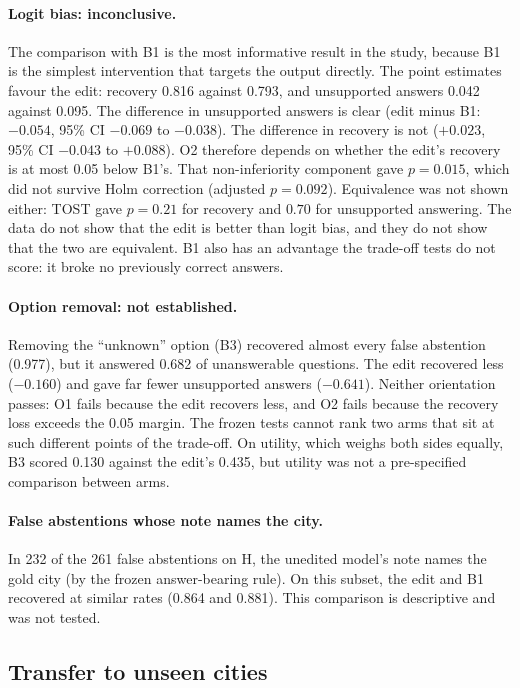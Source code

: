 \paragraph{Logit bias: inconclusive.}
The comparison with B1 is the most informative result in the study, because B1 is the simplest intervention that
targets the output directly. The point estimates favour the edit: recovery 0.816 against 0.793, and unsupported
answers 0.042 against 0.095. The difference in unsupported answers is clear (edit minus B1: $-0.054$, 95\% CI
$-0.069$ to $-0.038$). The difference in recovery is not ($+0.023$, 95\% CI $-0.043$ to $+0.088$). O2 therefore
depends on whether the edit's recovery is at most 0.05 below B1's. That non-inferiority component gave $p = 0.015$,
which did not survive Holm correction (adjusted $p = 0.092$). Equivalence was not shown either: TOST gave $p = 0.21$
for recovery and $0.70$ for unsupported answering. The data do not show that the edit is better than logit bias, and
they do not show that the two are equivalent. B1 also has an advantage the trade-off tests do not score: it broke no
previously correct answers.

\paragraph{Option removal: not established.}
Removing the ``unknown'' option (B3) recovered almost every false abstention (0.977), but it answered 0.682 of
unanswerable questions. The edit recovered less ($-0.160$) and gave far fewer unsupported answers ($-0.641$). Neither
orientation passes: O1 fails because the edit recovers less, and O2 fails because the recovery loss exceeds the 0.05
margin. The frozen tests cannot rank two arms that sit at such different points of the trade-off. On utility, which
weighs both sides equally, B3 scored 0.130 against the edit's 0.435, but utility was not a pre-specified comparison
between arms.

\paragraph{False abstentions whose note names the city.}
In 232 of the 261 false abstentions on H, the unedited model's note names the gold city (by the frozen
answer-bearing rule). On this subset, the edit and B1 recovered at similar rates (0.864 and 0.881). This comparison
is descriptive and was not tested.

\subsection{Transfer to unseen cities}

